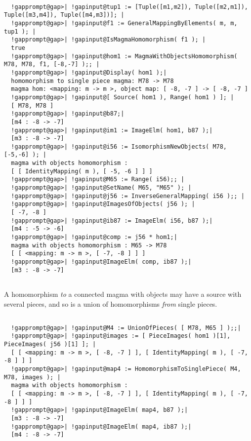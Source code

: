 \documentclass[a4paper,11pt]{report}
\begin{document}
{{{ }

 
\begin{Verbatim}[commandchars=!@|,fontsize=\small,frame=single,label=Example]
  
  !gapprompt@gap>| !gapinput@tup1 := [Tuple([m1,m2]), Tuple([m2,m1]), Tuple([m3,m4]), Tuple([m4,m3])]; |
  !gapprompt@gap>| !gapinput@f1 := GeneralMappingByElements( m, m, tup1 ); |
  !gapprompt@gap>| !gapinput@IsMagmaHomomorphism( f1 ); |
  true
  !gapprompt@gap>| !gapinput@hom1 := MagmaWithObjectsHomomorphism( M78, M78, f1, [-8,-7] );; |
  !gapprompt@gap>| !gapinput@Display( hom1 );|
  homomorphism to single piece magma: M78 -> M78
  magma hom: <mapping: m -> m >, object map: [ -8, -7 ] -> [ -8, -7 ]
  !gapprompt@gap>| !gapinput@[ Source( hom1 ), Range( hom1 ) ]; |
  [ M78, M78 ]
  !gapprompt@gap>| !gapinput@b87;|
  [m4 : -8 -> -7]
  !gapprompt@gap>| !gapinput@im1 := ImageElm( hom1, b87 );|
  [m3 : -8 -> -7]
  !gapprompt@gap>| !gapinput@i56 := IsomorphismNewObjects( M78, [-5,-6] ); |
  magma with objects homomorphism : 
  [ [ IdentityMapping( m ), [ -5, -6 ] ] ]
  !gapprompt@gap>| !gapinput@M65 := Range( i56);; |
  !gapprompt@gap>| !gapinput@SetName( M65, "M65" ); |
  !gapprompt@gap>| !gapinput@j56 := InverseGeneralMapping( i56 );; |
  !gapprompt@gap>| !gapinput@ImagesOfObjects( j56 ); |
  [ -7, -8 ]
  !gapprompt@gap>| !gapinput@ib87 := ImageElm( i56, b87 );|
  [m4 : -5 -> -6]
  !gapprompt@gap>| !gapinput@comp := j56 * hom1;|
  magma with objects homomorphism : M65 -> M78
  [ [ <mapping: m -> m >, [ -7, -8 ] ] ]
  !gapprompt@gap>| !gapinput@ImageElm( comp, ib87 );|
  [m3 : -8 -> -7]
  
\end{Verbatim}
 A homomorphism \emph{to} a connected magma with objects may have a source with several pieces, and so
is a union of homomorphisms \emph{from} single pieces. 

 
\begin{Verbatim}[commandchars=!@|,fontsize=\small,frame=single,label=Example]
  
  !gapprompt@gap>| !gapinput@M4 := UnionOfPieces( [ M78, M65 ] );;|
  !gapprompt@gap>| !gapinput@images := [ PieceImages( hom1 )[1], PieceImages( j56 )[1] ]; |
  [ [ <mapping: m -> m >, [ -8, -7 ] ], [ IdentityMapping( m ), [ -7, -8 ] ] ]
  !gapprompt@gap>| !gapinput@map4 := HomomorphismToSinglePiece( M4, M78, images ); |
  magma with objects homomorphism : 
  [ [ <mapping: m -> m >, [ -8, -7 ] ], [ IdentityMapping( m ), [ -7, -8 ] ] ]
  !gapprompt@gap>| !gapinput@ImageElm( map4, b87 );|
  [m3 : -8 -> -7]
  !gapprompt@gap>| !gapinput@ImageElm( map4, ib87 );|
  [m4 : -8 -> -7]
  

\end{Verbatim}}}
\end{document}
